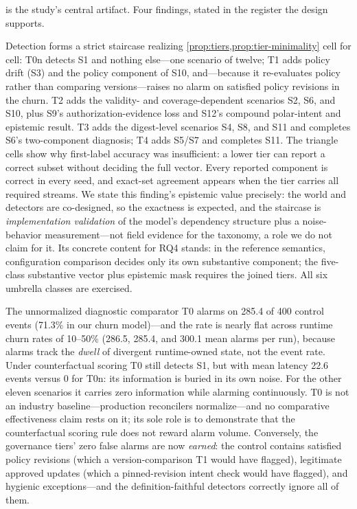  is the study's central artifact. Four findings, stated in
the register the design supports.

\begin{finding}
\label{fnd:staircase}
Detection forms a strict staircase realizing
\cref{prop:tiers,prop:tier-minimality} cell for cell: T0n detects S1 and
nothing else---one scenario of twelve; T1 adds policy drift (S3) and the
policy component of S10, and---because it re-evaluates policy rather than
comparing versions---raises no alarm on satisfied policy revisions in the
churn. T2 adds the validity- and coverage-dependent scenarios S2, S6, and
S10, plus S9's authorization-evidence loss and S12's compound polar-intent
and epistemic result.
T3 adds the digest-level scenarios S4, S8, and S11 and completes S6's
two-component diagnosis; T4 adds S5/S7 and completes S11. The triangle cells
show why first-label accuracy was insufficient: a lower tier can report a
correct subset without deciding the full vector. Every reported component is
correct in every seed, and exact-set agreement appears when the tier carries
all required streams. We state this finding's epistemic value precisely: the world and
detectors are co-designed, so the exactness is expected, and the staircase is
\emph{implementation validation} of the model's dependency structure plus a
noise-behavior measurement---not field evidence for the taxonomy, a role we
do not claim for it. Its concrete content for RQ4 stands: in the reference
semantics, configuration comparison decides only its own substantive
component; the five-class substantive vector plus epistemic mask requires the
joined tiers. All six umbrella classes are exercised.
\end{finding}

\begin{finding}
\label{fnd:naive}
The unnormalized diagnostic comparator T0 alarms on 285.4 of 400 control events
(71.3\% in our churn model)---and the rate is nearly flat across runtime
churn rates of 10--50\% (286.5, 285.4, and 300.1 mean alarms per run), because alarms
track the \emph{dwell} of divergent runtime-owned state, not the event
rate. Under counterfactual scoring T0 still detects S1, but with mean
latency 22.6 events versus 0 for T0n: its information is buried in its own
noise. For the other eleven scenarios it carries zero information while
alarming continuously. T0 is not an industry baseline---production
reconcilers normalize---and no comparative effectiveness claim rests on it;
its sole role is to demonstrate that the counterfactual scoring rule does not
reward alarm volume. Conversely, the governance tiers' zero false
alarms are now \emph{earned}: the control contains satisfied policy
revisions (which a version-comparison T1 would have flagged), legitimate
approved updates (which a pinned-revision intent check would have flagged),
and hygienic exceptions---and the definition-faithful detectors correctly
ignore all of them.
\end{finding}

